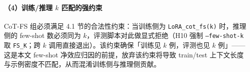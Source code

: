 \paragraph{（4）训练/推理 $k$ 匹配的强约束}
CoT-FS 组必须满足 4.1 节的合法性约束：当训练侧为 \texttt{LoRA\_cot\_fs(k)} 时，推理侧的 few-shot 数必须同为 $k$，评测脚本对此做显式拒绝（H10 强制 \texttt{--few-shot-k} 取 \texttt{FS\_K}；跨 $k$ 调用直接退出）。该约束确保「训练见 $k$ 例，评测也见 $k$ 例」——这是本文 few-shot 净效应归因的前提，放弃该约束将导致 train/test 上下文长度与示例密度不匹配，从而混淆训练侧与推理侧贡献。
